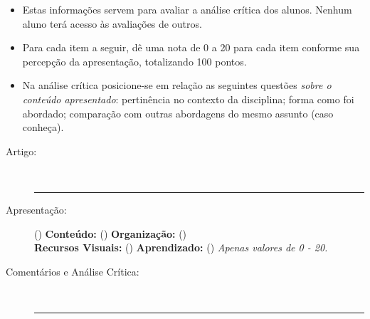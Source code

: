\documentclass{UnBExam}%
\begin{document}
%

    \begin{itemize}
    
        \item Estas informações servem para avaliar a análise crítica dos alunos. Nenhum aluno terá acesso às avaliações de outros.

        \item Para cada item a seguir, dê uma nota de 0 a 20 para cada item conforme sua percepção da apresentação, totalizando 100 pontos.

        \item Na análise crítica posicione-se em relação as seguintes questões \emph{sobre o conteúdo apresentado}: pertinência no contexto da disciplina; forma como foi abordado; comparação com outras abordagens do mesmo assunto (caso conheça).
	
	\end{itemize}
	
	\begin{description}
		\item[Artigo:] \hrulefill\\\hrule\vspace{1em}%
		\item[\hspace{1.45em}Apresentação:] (\hspace{2.5em}) \hfill%
			\textbf{Conteúdo:} (\hspace{2.5em}) \hfill%
			\textbf{Organização:} (\hspace{2.5em})\\%
			\hspace*{-2.5em}\textbf{Recursos Visuais:} (\hspace{2.5em}) \hspace{4.1em}%
			\textbf{Aprendizado:} (\hspace{2.5em})
			\hfill \emph{Apenas valores de 0 - 20.}\vspace{1em}%
			\item[Comentários e Análise Crítica:] \hrulefill\\\hrule
	\end{description}
\end{document}
